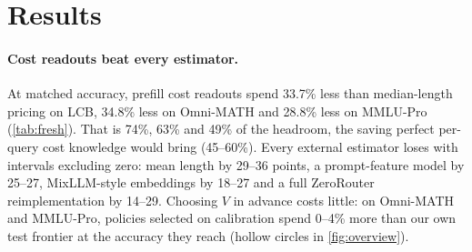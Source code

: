 \documentclass[10pt,twocolumn,letterpaper]{article}
\begin{document}
\begin{table}[t]
\centering
\footnotesize
\setlength{\tabcolsep}{3pt}
\caption{\textbf{Routes on the test sets.} Accuracy (\%) and mean billed cost per call (USD per 1,000 calls). No route dominates on every query: costs differ 17--29$\times$ across routes, and accuracy is not monotone in price.}
\label{tab:routes}
\end{table}


\section{Results}
\paragraph{Cost readouts beat every estimator.}
At matched accuracy, prefill cost readouts spend 33.7\% less than median-length pricing on LCB, 34.8\% less on Omni-MATH and 28.8\% less on MMLU-Pro (\cref{tab:fresh}). That is 74\%, 63\% and 49\% of the headroom, the saving perfect per-query cost knowledge would bring (45--60\%). Every external estimator loses with intervals excluding zero: mean length by 29--36 points, a prompt-feature model by 25--27, MixLLM-style embeddings by 18--27 and a full ZeroRouter reimplementation by 14--29. Choosing $V$ in advance costs little: on Omni-MATH and MMLU-Pro, policies selected on calibration spend 0--4\% more than our own test frontier at the accuracy they reach (hollow circles in \cref{fig:overview}).
\end{document}
